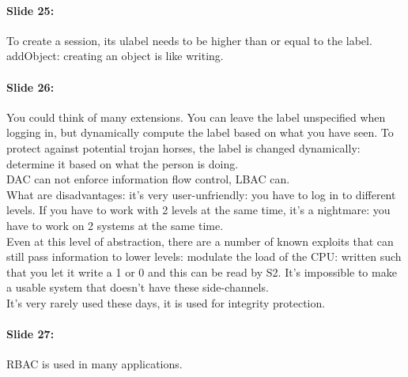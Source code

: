 \documentclass[10pt,a4paper]{report}
\begin{document}
\paragraph{Slide 25:} To create a session, its ulabel needs to be higher than or equal to the label. \\
addObject: creating an object is like writing. 

\paragraph{Slide 26:} You could think of many extensions. You can leave the label unspecified when logging in, but dynamically compute the label based on what you have seen. To protect against potential trojan horses, the label is changed dynamically: determine it based on what the person is doing. \\
DAC can not enforce information flow control, LBAC can.\\
What are disadvantages: it's very user-unfriendly: you have to log in to different levels. If you have to work with 2 levels at the same time, it's a nightmare: you have to work on 2 systems at the same time. \\
Even at this level of abstraction, there are a number of known exploits that can still pass information to lower levels: modulate the load of the CPU: written such that you let it write a 1 or 0 and this can be read by S2. It's impossible to make a usable system that doesn't have these side-channels.\\
It's very rarely used these days, it is used for integrity protection. 

\paragraph{Slide 27:} RBAC is used in many applications.
\end{document}
